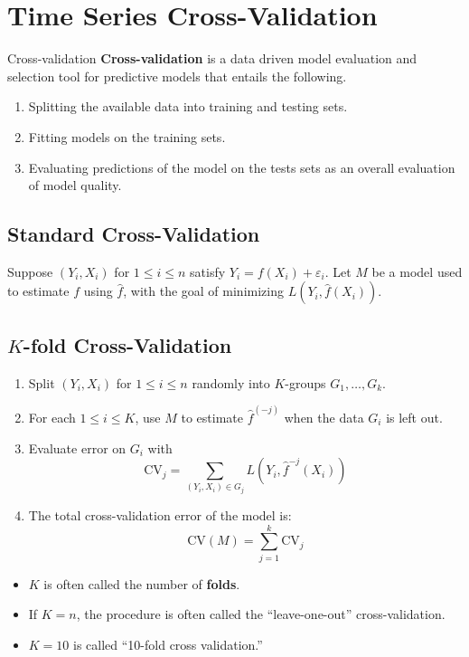 \section{Time Series Cross-Validation}
\begin{Definition}{Cross-validation}{}
    \textbf{Cross-validation} is a data driven model evaluation
    and selection tool for predictive models that entails the following.
    \begin{enumerate}[(1)]
        \item Splitting the available data into training and testing sets.
        \item Fitting models on the training sets.
        \item Evaluating predictions of the model on the tests sets as an overall
              evaluation of model quality.
    \end{enumerate}
\end{Definition}
\subsection*{Standard Cross-Validation}
Suppose $ (Y_i,X_i) $ for $ 1\le i\le n $ satisfy $ Y_i=f(X_i)+\varepsilon_i $.
Let $ M $ be a model used to estimate $ f $ using $ \hat{f} $,
with the goal of minimizing $ L(Y_i,\hat{f}(X_i)) $.
\subsection*{$ K $-fold Cross-Validation}
\begin{enumerate}[(1)]
    \item Split $ (Y_i,X_i) $ for $ 1\le i\le n $ randomly into $ K $-groups
          $ G_1,\ldots,G_k $.
    \item For each $ 1\le i\le K $, use $ M $ to estimate $ \hat{f}^{(-j)} $
          when the data $ G_i $ is left out.
    \item Evaluate error on $ G_i $ with
          \[ \text{CV}_j=\sum_{(Y_i,X_i)\in G_j}L(Y_i,\hat{f}^{-j}(X_i))  \]
    \item The total cross-validation error of the model is:
          \[ \text{CV}(M)=\sum_{j=1}^{k} \text{CV}_j \]
\end{enumerate}
\begin{Remark}{}{}
    \begin{itemize}
        \item $ K $ is often called the number of \textbf{folds}.
        \item If $ K=n $, the procedure is often called the ``leave-one-out''
              cross-validation.
        \item $ K=10 $ is called ``10-fold cross validation.''
    \end{itemize}
\end{Remark}
